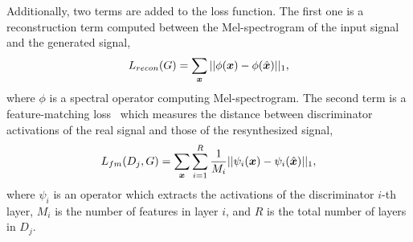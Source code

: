 Additionally, two terms are added to the loss function. 
The first one is a reconstruction term computed between the Mel-spectrogram of the input signal and the generated signal, 
\begin{equation}
\label{eq:recon}
 L_{recon}(G) = \sum_{\bm{x}}|| \phi(\bm{x}) - \phi(\hat{\bm{x}}) ||_1,
\end{equation}
where $\phi$ is a spectral operator computing Mel-spectrogram. The second term is a feature-matching loss~\cite{larsen2016autoencoding} which measures the distance between discriminator activations of the real signal and those of the resynthesized signal,
\begin{equation}
\label{eq:fm}
L_{fm}(D_j, G) = \sum_{\bm{x}}\sum_{i=1}^{R}\frac{1}{M_i}|| \psi_i(\bm{x}) - \psi_i(\hat{\bm{x}}) ||_1,
\end{equation}
where $\psi_i$ is an operator which extracts the activations of the discriminator $i$-th layer, $M_i$ is the number of features in layer $i$, and $R$ is the total number of layers in $D_j$. 



